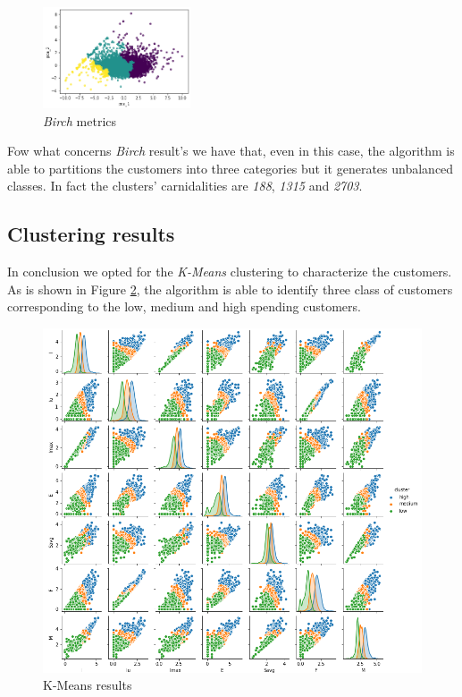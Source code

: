 \begin{figure}
	\vspace*{-1cm}
	\begin{center}
		\includegraphics[width=0.39\textwidth]{img/clustering/clust_birch.png}
	\end{center}
	\caption{\emph{Birch} metrics}
	\label{fig:clust_birch}
\end{figure}

Fow what concerns \emph{Birch} result's we have that, even in this case, the algorithm is able to partitions the customers into three categories but it generates unbalanced classes. In fact the clusters' carnidalities are \emph{188}, \emph{1315} and \emph{2703}.

\newpage

\subsection{Clustering results}

In conclusion we opted for the \emph{K-Means} clustering to characterize the customers. As is shown in Figure \ref{fig:pairplot}, the algorithm is able to identify three class of customers corresponding to the low, medium and high spending customers.

\begin{figure}[h!]
	\captionsetup{justification=centering}
	\centering
	\includegraphics[width=\textwidth]{img/clustering/pair_plot_clust.png}
	\centering
	\caption{K-Means results}
	\label{fig:pairplot}
\end{figure}


